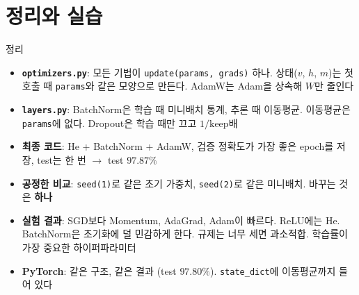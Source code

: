 \documentclass[aspectratio=169,11pt]{beamer}
\newcommand{\code}[1]{\texttt{#1}}
\begin{document}
\section{정리와 실습}

\begin{frame}{정리}
\begin{keybox}[이번 시간의 핵심]
\footnotesize
\begin{itemize}\setlength{\itemsep}{0.5mm}
\item \textbf{\code{optimizers.py}}: 모든 기법이 \code{update(params, grads)} 하나. 상태($v$, $h$, $m$)는 첫 호출 때 \code{params}와 같은 모양으로 만든다. AdamW는 Adam을 상속해 $W$만 줄인다
\item \textbf{\code{layers.py}}: BatchNorm은 학습 때 미니배치 통계, 추론 때 이동평균. 이동평균은 \code{params}에 없다. Dropout은 학습 때만 끄고 $1/\text{keep}$배
\item \textbf{최종 코드}: He + BatchNorm + AdamW, 검증 정확도가 가장 좋은 epoch를 저장, test는 한 번 $\to$ test $97.87\%$
\item \textbf{공정한 비교}: \code{seed(1)}로 같은 초기 가중치, \code{seed(2)}로 같은 미니배치. 바꾸는 것은 \textbf{하나}
\item \textbf{실험 결과}: SGD보다 Momentum, AdaGrad, Adam이 빠르다. ReLU에는 He. BatchNorm은 초기화에 덜 민감하게 한다.
규제는 너무 세면 과소적합. 학습률이 가장 중요한 하이퍼파라미터
\item \textbf{PyTorch}: 같은 구조, 같은 결과 (test $97.80\%$). \code{state\_dict}에 이동평균까지 들어 있다
\end{itemize}
\end{keybox}
\end{frame}
\end{document}
